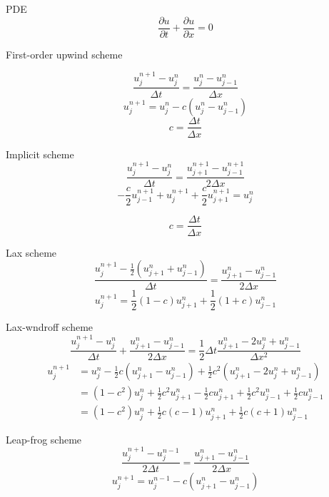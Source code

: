 \documentclass{article}%
\begin{document}
PDE%
\[
\frac{\partial u}{\partial t}+\frac{\partial u}{\partial x}=0
\]


First-order upwind scheme%

\[
\frac{u_{j}^{n+1}-u_{j}^{n}}{\Delta t}=\frac{u_{j}^{n}-u_{j-1}^{n}}{\Delta x}%
\]%
\[
u_{j}^{n+1}=u_{j}^{n}-c\left(  u_{j}^{n}-u_{j-1}^{n}\right)
\]%
\[
c=\frac{\Delta t}{\Delta x}%
\]


Implicit scheme%
\[
\frac{u_{j}^{n+1}-u_{j}^{n}}{\Delta t}=\frac{u_{j+1}^{n+1}-u_{j-1}^{n+1}%
}{2\Delta x}%
\]%
\[
-\frac{c}{2}u_{j-1}^{n+1}+u_{j}^{n+1}+\frac{c}{2}u_{j+1}^{n+1}=u_{j}^{n}%
\]
%

\[
c=\frac{\Delta t}{\Delta x}%
\]


Lax scheme%
\[
\frac{u_{j}^{n+1}-\frac{1}{2}\left(  u_{j+1}^{n}+u_{j-1}^{n}\right)  }{\Delta
t}=\frac{u_{j+1}^{n}-u_{j-1}^{n}}{2\Delta x}%
\]%
\[
u_{j}^{n+1}=\frac{1}{2}\left(  1-c\right)  u_{j+1}^{n}+\frac{1}{2}\left(
1+c\right)  u_{j-1}^{n}%
\]


Lax-wndroff scheme%
\[
\frac{u_{j}^{n+1}-u_{j}^{n}}{\Delta t}+\frac{u_{j+1}^{n}-u_{j-1}^{n}}{2\Delta
x}=\frac{1}{2}\Delta t\frac{u_{j+1}^{n}-2u_{j}^{n}+u_{j-1}^{n}}{\Delta x^{2}}%
\]%
\begin{align*}
u_{j}^{n+1}  & =u_{j}^{n}-\frac{1}{2}c\left(  u_{j+1}^{n}-u_{j-1}^{n}\right)
+\frac{1}{2}c^{2}\left(  u_{j+1}^{n}-2u_{j}^{n}+u_{j-1}^{n}\right)  \\
& =\left(  1-c^{2}\right)  u_{j}^{n}+\frac{1}{2}c^{2}u_{j+1}^{n}-\frac{1}%
{2}cu_{j+1}^{n}+\frac{1}{2}c^{2}u_{j-1}^{n}+\frac{1}{2}cu_{j-1}^{n}\\
& =\left(  1-c^{2}\right)  u_{j}^{n}+\frac{1}{2}c\left(  c-1\right)
u_{j+1}^{n}+\frac{1}{2}c\left(  c+1\right)  u_{j-1}^{n}%
\end{align*}


Leap-frog scheme%
\[
\frac{u_{j}^{n+1}-u_{j}^{n-1}}{2\Delta t}=\frac{u_{j+1}^{n}-u_{j-1}^{n}%
}{2\Delta x}%
\]%
\[
u_{j}^{n+1}=u_{j}^{n-1}-c\left(  u_{j+1}^{n}-u_{j-1}^{n}\right)
\]
\end{document}
